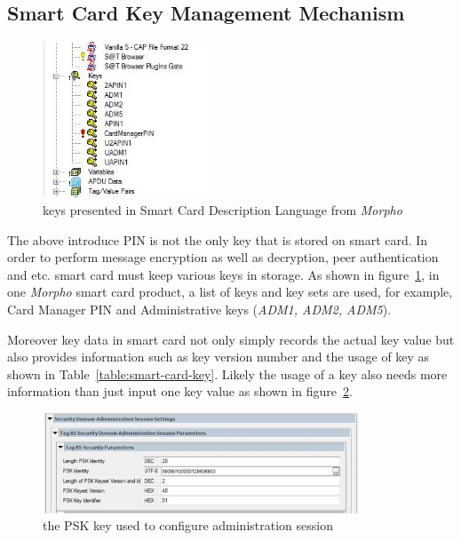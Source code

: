 \subsection{Smart Card Key Management Mechanism} \label{labelKeyManagement}

 \begin{figure}[!htb]
	\centering
	\includegraphics[width=0.45\textwidth]{smart-card-key.jpg}
		\caption{keys presented in Smart Card Description Language from \emph{Morpho}}
	\label{fig:smart-card-key}
\end{figure}

The above introduce PIN is not the only key that is stored on smart card. In order to perform message encryption as well as decryption, peer authentication and etc. smart card must keep various keys in storage. As shown in figure~\ref{fig:smart-card-key}, in one \emph{Morpho} smart card product, a list of keys and key sets are used, for example, Card Manager PIN and Administrative keys (\emph{ADM1, ADM2, ADM5}).

Moreover key data in smart card not only simply records the actual key value but also provides information such as key version number and the usage of key as shown in Table~\ref{table:smart-card-key}. Likely the usage of a key also needs more information than just input one key value as shown in figure~\ref{fig:smart-card-key-use}.

 \begin{figure}[!htb]
	\centering
	\includegraphics[width=0.85\textwidth]{smart-card-key-use.jpg}
		\caption{the PSK key used to configure administration session}
	\label{fig:smart-card-key-use}
\end{figure}

